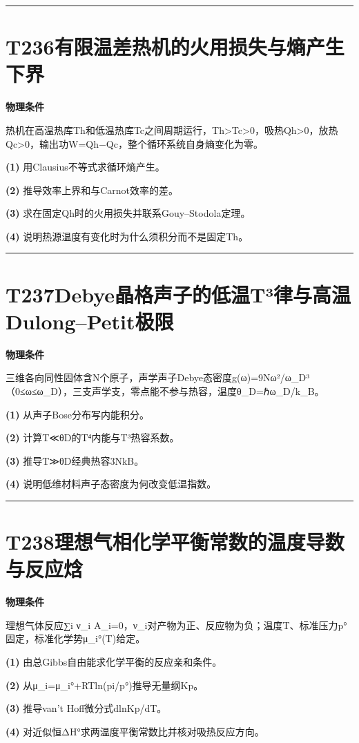 \documentclass[UTF8,a4paper,11pt,oneside,openany]{ctexbook}
\begin{document}
\par\bigskip\hrule\bigskip
\section*{T236\quad 有限温差热机的火用损失与熵产生下界}
\textbf{物理条件}\par 热机在高温热库Th和低温热库Tc之间周期运行，Th>Tc>0，吸热Qh>0，放热Qc>0，输出功W=Qh−Qc，整个循环系统自身熵变化为零。
\par\noindent\textbf{(1)} 用Clausius不等式求循环熵产生。
\par\noindent\textbf{(2)} 推导效率上界和与Carnot效率的差。
\par\noindent\textbf{(3)} 求在固定Qh时的火用损失并联系Gouy–Stodola定理。
\par\noindent\textbf{(4)} 说明热源温度有变化时为什么须积分而不是固定Th。

\par\bigskip\hrule\bigskip
\section*{T237\quad Debye晶格声子的低温T³律与高温Dulong–Petit极限}
\textbf{物理条件}\par 三维各向同性固体含N个原子，声学声子Debye态密度g(ω)=9Nω²/ω\_D³（0≤ω≤ω\_D），三支声学支，零点能不参与热容，温度θ\_D=ℏω\_D/k\_B。
\par\noindent\textbf{(1)} 从声子Bose分布写内能积分。
\par\noindent\textbf{(2)} 计算T≪θD的T⁴内能与T³热容系数。
\par\noindent\textbf{(3)} 推导T≫θD经典热容3NkB。
\par\noindent\textbf{(4)} 说明低维材料声子态密度为何改变低温指数。

\par\bigskip\hrule\bigskip
\section*{T238\quad 理想气相化学平衡常数的温度导数与反应焓}
\textbf{物理条件}\par 理想气体反应∑i ν\_i A\_i=0，ν\_i对产物为正、反应物为负；温度T、标准压力p°固定，标准化学势μ\_i°(T)给定。
\par\noindent\textbf{(1)} 由总Gibbs自由能求化学平衡的反应亲和条件。
\par\noindent\textbf{(2)} 从μ\_i=μ\_i°+RTln(pi/p°)推导无量纲Kp。
\par\noindent\textbf{(3)} 推导van’t Hoff微分式dlnKp/dT。
\par\noindent\textbf{(4)} 对近似恒ΔH°求两温度平衡常数比并核对吸热反应方向。
\end{document}
